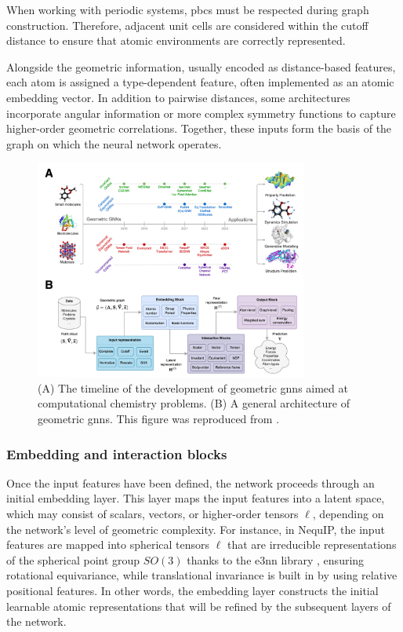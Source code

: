 When working with periodic systems, \acp{pbc} must be respected during graph construction. Therefore, adjacent unit cells are considered within the cutoff distance to ensure that atomic environments are correctly represented.

Alongside the geometric information, usually encoded as distance-based features, each atom is assigned a type-dependent feature, often implemented as an atomic embedding vector. In addition to pairwise distances, some architectures incorporate angular information or more complex symmetry functions to capture higher-order geometric correlations. Together, these inputs form the basis of the graph on which the neural network operates.

\begin{figure}[t!]
    \centering
    \includegraphics[width=0.8\textwidth]{Figures/2_Theory/equivariant_gnns.png}
    \caption{(A) The timeline of the development of geometric \acp{gnn} aimed at computational chemistry problems. (B) A general architecture of geometric \acp{gnn}. This figure was reproduced from \citep{duvalHitchhikersGuideGeometric2024}.}
    \label{fig:equivariant_gnns}
\end{figure}

\subsubsection{Embedding and interaction blocks}
Once the input features have been defined, the network proceeds through an initial embedding layer. This layer maps the input features into a latent space, which may consist of scalars, vectors, or higher-order tensors $\ell$, depending on the network's level of geometric complexity. For instance, in NequIP, the input features are mapped into spherical tensors $\ell$ that are irreducible representations of the spherical point group $SO(3)$ thanks to the e3nn library \citep{geigerE3nnEuclideanNeural2022}, ensuring rotational equivariance, while translational invariance is built in by using relative positional features. In other words, the embedding layer constructs the initial learnable atomic representations that will be refined by the subsequent layers of the network.

